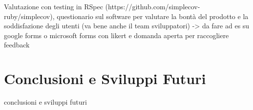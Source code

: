 \documentclass[target=bach,aauheader=,style=]{thud}
\begin{document}
Valutazione con testing in RSpec (https://github.com/simplecov-ruby/simplecov), questionario sul software per valutare
la bontà del prodotto e la soddisfazione degli utenti (va bene anche il team sviluppatori) -> da fare ad es su google forms o
microsoft forms con likert e domanda aperta per raccogliere feedback

\chapter{Conclusioni e Sviluppi Futuri}

conclusioni e sviluppi futuri


\appendix



\backmatter




\end{document}
